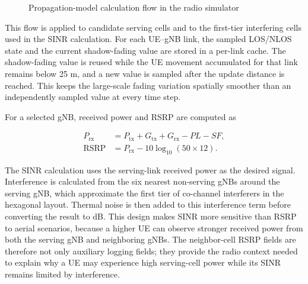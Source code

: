 \begin{figure}[!htbp]
\centering
{}
\caption{Propagation-model calculation flow in the radio simulator}
\label{fig:propagation-calculation-flow}
\end{figure}


This flow is applied to candidate serving cells and to the first-tier interfering cells used in the SINR calculation. For each UE--gNB link, the sampled LOS/NLOS state and the current shadow-fading value are stored in a per-link cache. The shadow-fading value is reused while the UE movement accumulated for that link remains below 25 m, and a new value is sampled after the update distance is reached. This keeps the large-scale fading variation spatially smoother than an independently sampled value at every time step.

For a selected gNB, received power and RSRP are computed as

\begin{align}
P_{\mathrm{rx}} &= P_{\mathrm{tx}}+G_{\mathrm{tx}}+G_{\mathrm{rx}}-PL-SF,\\
\mathrm{RSRP} &= P_{\mathrm{rx}}-10\log_{10}(50\times12).
\end{align}

The SINR calculation uses the serving-link received power as the desired signal. Interference is calculated from the six nearest non-serving gNBs around the serving gNB, which approximate the first tier of co-channel interferers in the hexagonal layout. Thermal noise is then added to this interference term before converting the result to dB. This design makes SINR more sensitive than RSRP to aerial scenarios, because a higher UE can observe stronger received power from both the serving gNB and neighboring gNBs. The neighbor-cell RSRP fields are therefore not only auxiliary logging fields; they provide the radio context needed to explain why a UE may experience high serving-cell power while its SINR remains limited by interference.

